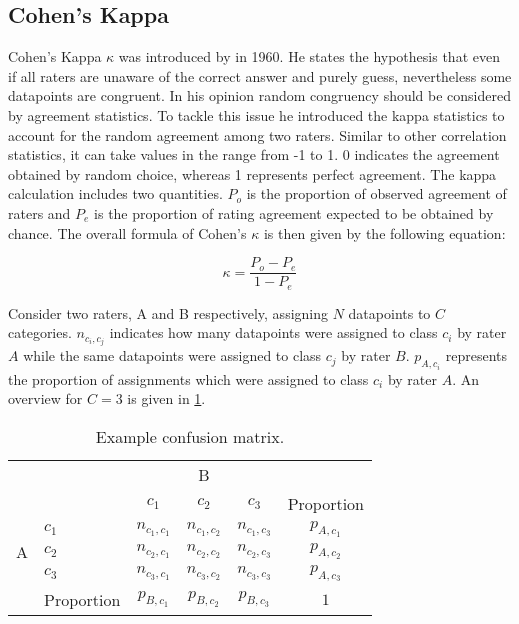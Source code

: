 \subsection{Cohen's Kappa}
\label{chp:fundamentals:sec:inter_rater_agreement:subsec:cohens_kappa}
Cohen's Kappa $\kappa$ was introduced by \textcite{Cohen:1960} in 1960.
He states the hypothesis that even if all raters are unaware of the correct answer and purely guess, nevertheless some datapoints are congruent.
In his opinion random congruency should be considered by agreement statistics.
To tackle this issue he introduced the kappa statistics to account for the random agreement among two raters.
Similar to other correlation statistics, it can take values in the range from -1 to 1.
0 indicates the agreement obtained by random choice, whereas 1 represents perfect agreement.
The kappa calculation includes two quantities.
$P_o$ is the proportion of observed agreement of raters and $P_e$ is the proportion of rating agreement expected to be obtained by chance.
The overall formula of Cohen's $\kappa$ is then given by the following equation:

\begin{equation}\label{eq:Cohens_kappa}
    \kappa = \frac{P_o - P_e}{1 - P_e}
\end{equation}

Consider two raters, A and B respectively, assigning $N$ datapoints to $C$ categories.
$n_{c_i, c_j}$ indicates how many datapoints were assigned to class $c_i$ by rater $A$ while the same datapoints were assigned to class $c_j$ by rater $B$.
$p_{A, c_i}$ represents the proportion of assignments which were assigned to class $c_i$ by rater $A$.
An overview for $C=3$ is given in \cref{tab:cohens_kappa_sample_definition}.

\begin{table}[htpb]
    \centering
    \begin{tabular}{l|l|c|c|c|c}
        \multicolumn{2}{c}{}&\multicolumn{3}{c}{B}&\\
        \cline{3-5}
        \multicolumn{2}{c|}{}&$c_1$&$c_2$&$c_3$&\multicolumn{1}{c}{Proportion}\\
        \cline{2-5}
        \multirow{3}{*}{A}& $c_1$ & $n_{c_1, c_1}$ & $n_{c_1, c_2}$ &$n_{c_1, c_3}$& $p_{A, c_1}$\\
        \cline{2-5}
        & $c_2$ & $n_{c_2, c_1}$ & $n_{c_2, c_2}$ &$n_{c_2, c_3}$&$p_{A, c_2}$\\
        \cline{2-5}
        & $c_3$ & $n_{c_3, c_1}$ & $n_{c_3, c_2}$ &$n_{c_3, c_3}$ & $p_{A, c_3}$\\
        \cline{2-5}
        \multicolumn{1}{c}{} & \multicolumn{1}{c}{Proportion} & \multicolumn{1}{c}{$p_{B, c_1}$} & \multicolumn{1}{c}{$p_{B, c_2}$} & \multicolumn{1}{c}{$p_{B, c_3}$} & \multicolumn{1}{c}{$1$}\\
    \end{tabular}
    \caption[Cohen's Kappa notation overview]{Example confusion matrix.}\label{tab:cohens_kappa_sample_definition}
\end{table}

